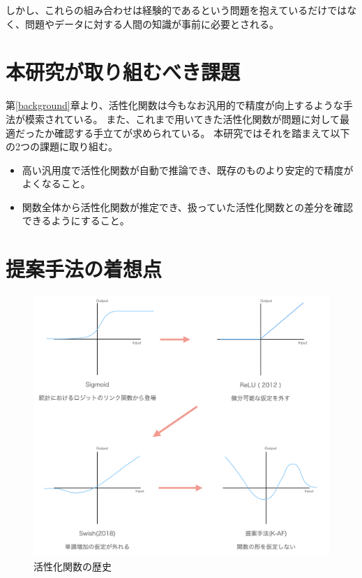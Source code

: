しかし、これらの組み合わせは経験的であるという問題を抱えているだけではなく、問題やデータに対する人間の知識が事前に必要とされる。


\section{本研究が取り組むべき課題}
\label{honkadai}

第\ref{background}章より、活性化関数は今もなお汎用的で精度が向上するような手法が模索されている。
また、これまで用いてきた活性化関数が問題に対して最適だったか確認する手立てが求められている。
本研究ではそれを踏まえて以下の2つの課題に取り組む。

\begin{itemize}
  \item 高い汎用度で活性化関数が自動で推論でき、既存のものより安定的で精度がよくなること。
  \item 関数全体から活性化関数が推定でき、扱っていた活性化関数との差分を確認できるようにすること。
\end{itemize}



\section{提案手法の着想点}
\label{history_activation}

\begin{figure}[hbtp]
\includegraphics[width=15cm]{asset/history_af.png}
	\caption{活性化関数の歴史}
	\label{history_af}
\end{figure}


